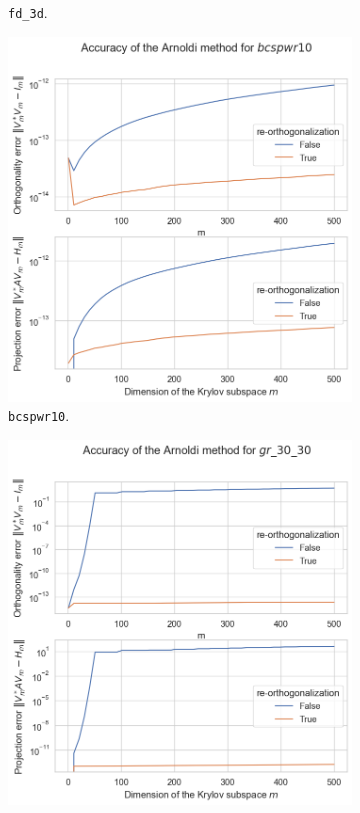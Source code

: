 \begin{figure}[h!]
\begin{subfigure}[b]{0.45\textwidth}
        \caption{\texttt{fd\_3d}.}
    \end{subfigure}
    \vfill
    \begin{subfigure}[b]{0.45\textwidth}
        \includegraphics[width=\textwidth]{img/arnoldi/bcspwr10.png}
        \caption{\texttt{bcspwr10}.}
    \end{subfigure}
    \hfill
    \begin{subfigure}[b]{0.45\textwidth}
        \includegraphics[width=\textwidth]{img/arnoldi/gr_30_30.png}

\end{subfigure}
\end{figure}
